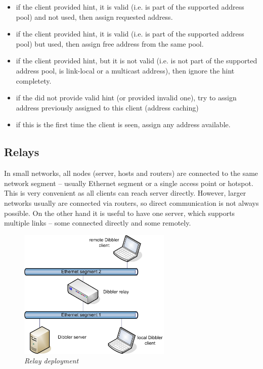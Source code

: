 \begin{itemize}
 \item if the client provided hint, it is valid (i.e. is part of the
       supported address pool) and not used, then assign requested address.
 \item if the client provided hint, it is valid (i.e. is part of the 
       supported address pool) but used, then assign free address from
       the same pool.
 \item if the client provided hint, but it is not valid (i.e. is not
       part of the supported address pool, is link-local or a multicast
       address), then ignore the hint completety.
 \item if the did not provide valid hint (or provided invalid one), try
       to assign address previously assigned to this client (address caching)
 \item if this is the first time the client is seen, assign any address
       available.
\end{itemize}

\subsection{Relays}
\label{features-relays}
In small networks, all nodes (server, hosts and routers) are connected
to the same network segment -- usually Ethernet segment or a single
access point or hotspot. This is very convenient as all clients can
reach server directly. However, larger networks usually are connected
via routers, so direct communication is not always possible. On the
other hand it is useful to have one server, which supports multiple
links -- some connected directly and some remotely.

\begin{figure}[ht]
\begin{center}
\includegraphics[width=0.65\textwidth]{dibbler-relay}
\caption{\emph{Relay deployment}}
\end{center}
\end{figure}

